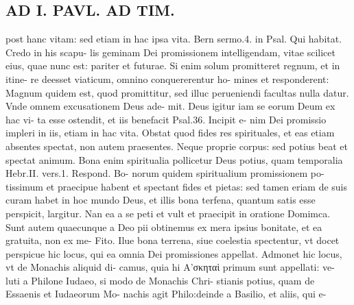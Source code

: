 \documentclass{article}
\begin{document}
\begin{pages}
\section*{AD I. PAVL. AD TIM. }
\marginpar{[ p.212 ]}\pstart post hanc vitam: sed etiam in hac ipsa vita. Bern sermo.4. in Psal. Qui habitat. Credo in his scapu- lis geminam Dei promissionem intelligendam, vitae scilicet eius, quae nunc est: pariter et futurae. Si enim solum promitteret regnum, et in itine- re deesset viaticum, omnino conquererentur ho- mines et responderent: Magnum quidem est, quod promittitur, sed illuc perueniendi facultas nulla datur. Vnde omnem excusationem Deus ade- mit. Deus igitur iam se eorum Deum ex hac vi- ta esse ostendit, et iis benefacit Psal.36. Incipit e- nim Dei promissio impleri in iis, etiam in hac vita. Obstat quod fides res spirituales, et eas etiam absentes spectat, non autem praesentes. Neque proprie corpus: sed potius beat et spectat animum. Bona enim spiritualia pollicetur Deus potius, quam temporalia Hebr.II. vers.1. Respond. Bo- norum quidem spiritualium promissionem po- tissimum et praecipue habent et spectant fides et pietas: sed tamen eriam de suis curam habet in hoc mundo Deus, et illis bona terfena, quantum satis esse perspicit, largitur. Nan ea a se peti et vult et praecipit in oratione Domimca. Sunt autem quaecunque a Deo pii obtinemus ex mera ipsius bonitate, et ea gratuita, non ex me- Fito. Ilue bona terrena, siue coelestia spectentur, vt docet perspicue hic locus, qui ea omnia Dei promissiones appellat. Admonet hic locus, vt de Monachis aliquid di- camus, quia hi Α'σκηταὶ primum sunt appellati: ve- luti a Philone Iudaeo, si modo de Monachis Chri- stianis potius, quam de Essaenis et Iudaeorum Mo- nachis agit Philo:deinde a Basilio, et aliis, qui e-  \pend

\end{pages}
\end{document}
